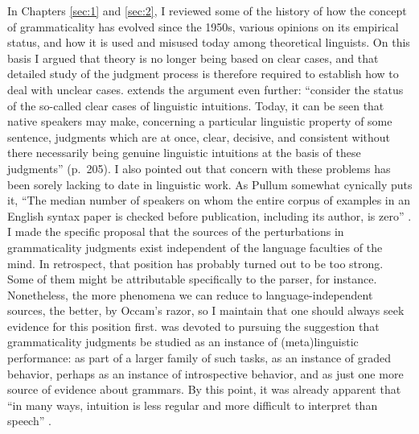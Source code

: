 In Chapters \ref{sec:1} and \ref{sec:2}, I reviewed some of the history of how the concept of grammaticality has evolved since the 1950s, various opinions on its empirical status, and how it is used and misused today among theoretical linguists. On this basis I argued that theory is no longer being based on clear cases, and that detailed study of the judgment process is therefore required to establish how to deal with unclear cases. \citet{Botha1973} extends the argument even further: ``consider the status of the so-called clear cases of linguistic intuitions. Today, it can be seen that
 native speakers may make, concerning a particular linguistic property of some sentence, judgments which are at once, clear, decisive, and consistent without there necessarily being genuine linguistic intuitions at the basis of these judgments'' (p.~205). I also pointed out that concern with these problems has been sorely lacking to date in linguistic work. As Pullum somewhat cynically puts it, ``The median number of speakers on whom the entire corpus of examples in an English syntax paper is checked before publication, including its author, is zero'' \citep[453]{Pullum1987}. I made the specific proposal that the sources of the perturbations in grammaticality judgments exist independent of the language faculties of the mind. In retrospect, that position has probably turned out to be too strong. Some of them might be attributable specifically to the parser, for instance. Nonetheless, the more phenomena we can reduce to language-independent sources, the better, by Occam's razor, so I maintain that one should always seek evidence for this position first.  was devoted to pursuing the suggestion that grammaticality judgments be studied as an instance of (meta)linguistic performance: as part of a larger family of such tasks, as an instance of graded behavior, perhaps as an instance of introspective behavior, and as just one more source of evidence about grammars. By this point, it was already apparent that ``in many ways, intuition is less regular and more difficult to interpret than speech'' \citep[199]{Labov1972a}.


